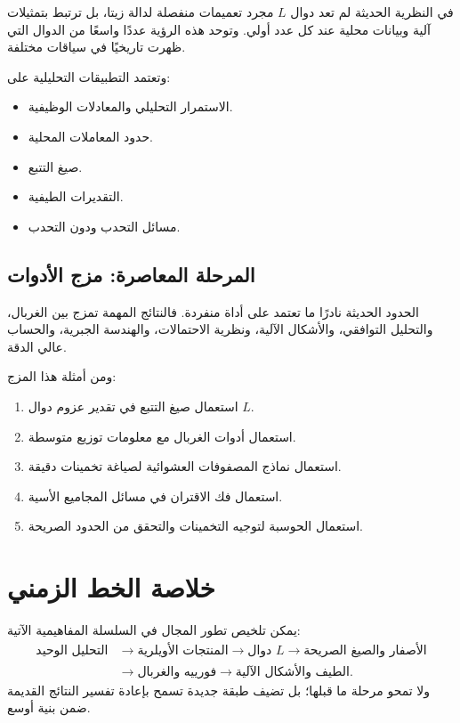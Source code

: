 في النظرية الحديثة لم تعد دوال \(L\) مجرد تعميمات منفصلة لدالة زيتا، بل ترتبط بتمثيلات آلية وبيانات محلية عند كل عدد أولي. وتوحد هذه الرؤية عددًا واسعًا من الدوال التي ظهرت تاريخيًا في سياقات مختلفة.

وتعتمد التطبيقات التحليلية على:

\begin{itemize}
  \item الاستمرار التحليلي والمعادلات الوظيفية.
  \item حدود المعاملات المحلية.
  \item صيغ التتبع.
  \item التقديرات الطيفية.
  \item مسائل التحدب ودون التحدب.
\end{itemize}

\subsection{المرحلة المعاصرة: مزج الأدوات}

الحدود الحديثة نادرًا ما تعتمد على أداة منفردة. فالنتائج المهمة تمزج بين الغربال، والتحليل التوافقي، والأشكال الآلية، ونظرية الاحتمالات، والهندسة الجبرية، والحساب عالي الدقة.

ومن أمثلة هذا المزج:

\begin{enumerate}
  \item استعمال صيغ التتبع في تقدير عزوم دوال \(L\).
  \item استعمال أدوات الغربال مع معلومات توزيع متوسطة.
  \item استعمال نماذج المصفوفات العشوائية لصياغة تخمينات دقيقة.
  \item استعمال فك الاقتران في مسائل المجاميع الأسية.
  \item استعمال الحوسبة لتوجيه التخمينات والتحقق من الحدود الصريحة.
\end{enumerate}

\section{خلاصة الخط الزمني}

يمكن تلخيص تطور المجال في السلسلة المفاهيمية الآتية:
\[
\begin{aligned}
\text{التحليل الوحيد}
&\longrightarrow
\text{المنتجات الأويلرية}
\longrightarrow
\text{دوال }L
\longrightarrow
\text{الأصفار والصيغ الصريحة}
\\
&\longrightarrow
\text{فورييه والغربال}
\longrightarrow
\text{الطيف والأشكال الآلية}.
\end{aligned}
\]
ولا تمحو مرحلة ما قبلها؛ بل تضيف طبقة جديدة تسمح بإعادة تفسير النتائج القديمة ضمن بنية أوسع.



